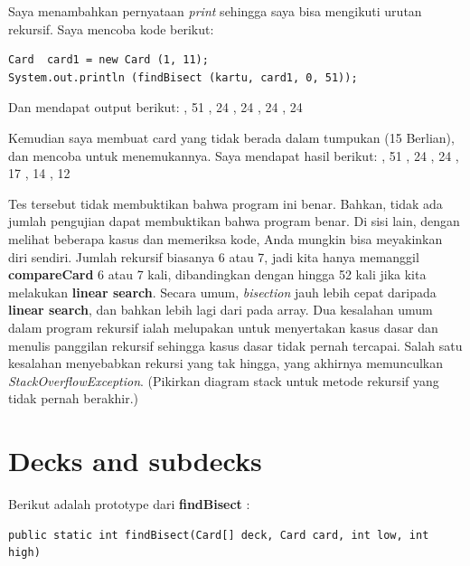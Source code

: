 Saya menambahkan pernyataan \textit{print} sehingga saya bisa mengikuti urutan rekursif. Saya mencoba kode berikut: 
\begin{lstlisting}
Card  card1 = new Card (1, 11); 
System.out.println (findBisect (kartu, card1, 0, 51)); 
\end{lstlisting}

\noindent Dan mendapat output berikut: 
, 51 
, 24 
, 24 
, 24 
, 24 

\noindent Kemudian saya membuat card yang tidak berada dalam tumpukan (15 Berlian), dan mencoba untuk menemukannya. Saya mendapat hasil berikut: 
, 51 
, 24 
, 24 
, 17 
, 14 
, 12

\noindent Tes tersebut tidak membuktikan bahwa program ini benar. Bahkan, tidak ada jumlah pengujian dapat membuktikan bahwa program benar. Di sisi lain, dengan melihat beberapa kasus dan memeriksa kode, Anda mungkin bisa meyakinkan diri sendiri.
Jumlah rekursif biasanya 6 atau 7, jadi kita hanya memanggil \textbf{compareCard} 6 atau 7 kali, dibandingkan dengan hingga 52 kali jika kita melakukan \textbf{linear search}. Secara umum, \textit{bisection} jauh lebih cepat daripada \textbf{linear search}, dan bahkan lebih lagi dari pada array.
Dua kesalahan umum dalam program rekursif ialah melupakan untuk menyertakan kasus dasar dan menulis panggilan rekursif sehingga kasus dasar tidak pernah tercapai. 
Salah satu kesalahan menyebabkan rekursi yang tak hingga, yang akhirnya memunculkan \textit{StackOverflowException}. (Pikirkan diagram stack untuk metode rekursif yang tidak pernah berakhir.)

\section{Decks and subdecks}
Berikut adalah prototype dari \textbf{findBisect} :
\begin{lstlisting}
public static int findBisect(Card[] deck, Card card, int low, int high)
\end{lstlisting}

